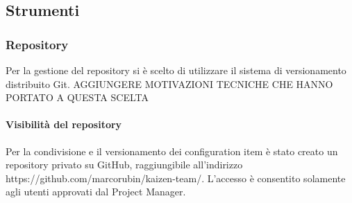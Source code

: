 	\subsection{Strumenti}	
		\subsubsection{Repository}
			Per la gestione del repository si è scelto di utilizzare il sistema di versionamento distribuito Git. AGGIUNGERE MOTIVAZIONI TECNICHE CHE HANNO PORTATO A QUESTA SCELTA
				\paragraph{Visibilità del repository}
				Per la condivisione e il versionamento dei configuration item è stato creato un repository privato su GitHub, raggiungibile all’indirizzo https://github.com/marcorubin/kaizen-team/. L’accesso è consentito solamente agli utenti approvati dal Project Manager.
						
